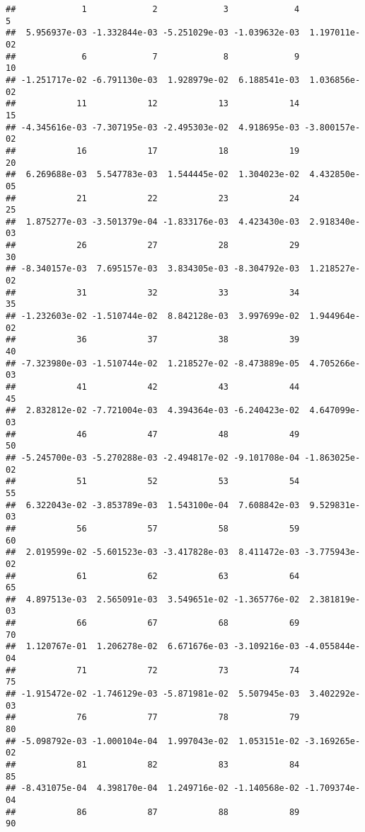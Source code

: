 \documentclass[
]{article}
\begin{document}
\begin{verbatim}
##             1             2             3             4             5 
##  5.956937e-03 -1.332844e-03 -5.251029e-03 -1.039632e-03  1.197011e-02 
##             6             7             8             9            10 
## -1.251717e-02 -6.791130e-03  1.928979e-02  6.188541e-03  1.036856e-02 
##            11            12            13            14            15 
## -4.345616e-03 -7.307195e-03 -2.495303e-02  4.918695e-03 -3.800157e-02 
##            16            17            18            19            20 
##  6.269688e-03  5.547783e-03  1.544445e-02  1.304023e-02  4.432850e-05 
##            21            22            23            24            25 
##  1.875277e-03 -3.501379e-04 -1.833176e-03  4.423430e-03  2.918340e-03 
##            26            27            28            29            30 
## -8.340157e-03  7.695157e-03  3.834305e-03 -8.304792e-03  1.218527e-02 
##            31            32            33            34            35 
## -1.232603e-02 -1.510744e-02  8.842128e-03  3.997699e-02  1.944964e-02 
##            36            37            38            39            40 
## -7.323980e-03 -1.510744e-02  1.218527e-02 -8.473889e-05  4.705266e-03 
##            41            42            43            44            45 
##  2.832812e-02 -7.721004e-03  4.394364e-03 -6.240423e-02  4.647099e-03 
##            46            47            48            49            50 
## -5.245700e-03 -5.270288e-03 -2.494817e-02 -9.101708e-04 -1.863025e-02 
##            51            52            53            54            55 
##  6.322043e-02 -3.853789e-03  1.543100e-04  7.608842e-03  9.529831e-03 
##            56            57            58            59            60 
##  2.019599e-02 -5.601523e-03 -3.417828e-03  8.411472e-03 -3.775943e-02 
##            61            62            63            64            65 
##  4.897513e-03  2.565091e-03  3.549651e-02 -1.365776e-02  2.381819e-03 
##            66            67            68            69            70 
##  1.120767e-01  1.206278e-02  6.671676e-03 -3.109216e-03 -4.055844e-04 
##            71            72            73            74            75 
## -1.915472e-02 -1.746129e-03 -5.871981e-02  5.507945e-03  3.402292e-03 
##            76            77            78            79            80 
## -5.098792e-03 -1.000104e-04  1.997043e-02  1.053151e-02 -3.169265e-02 
##            81            82            83            84            85 
## -8.431075e-04  4.398170e-04  1.249716e-02 -1.140568e-02 -1.709374e-04 
##            86            87            88            89            90 

\end{verbatim}
\end{document}
